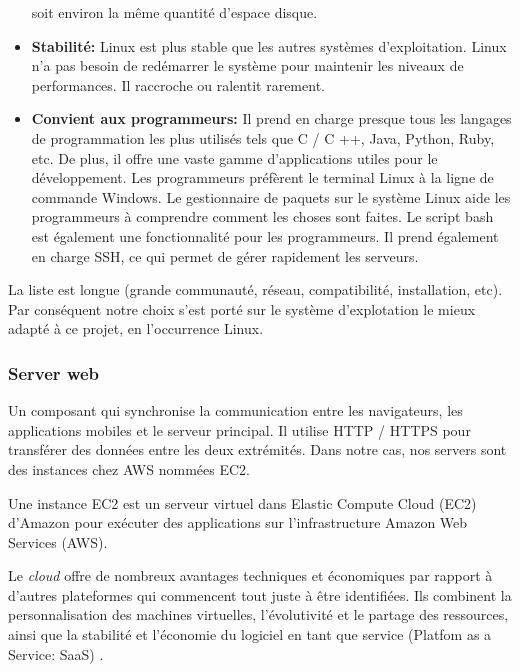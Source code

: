 \begin{itemize}
                soit environ la même quantité d'espace disque.
                \item \textbf{Stabilité: }
                Linux est plus stable que les autres systèmes d'exploitation. Linux n'a pas 
                besoin de redémarrer le système pour maintenir les niveaux de performances. 
                Il raccroche ou ralentit rarement.
                \item \textbf{Convient aux programmeurs: }
                Il prend en charge presque tous les langages de programmation les plus utilisés 
                tels que C / C ++, Java, Python, Ruby, etc. De plus, il offre une vaste gamme 
                d'applications utiles pour le développement.
                Les programmeurs préfèrent le terminal Linux à la ligne de commande Windows. 
                Le gestionnaire de paquets sur le système Linux aide les programmeurs à 
                comprendre comment les choses sont faites. Le script bash est également une 
                fonctionnalité pour les programmeurs. Il prend également en charge SSH, 
                ce qui permet de gérer rapidement les serveurs.
                
        \end{itemize}
        La liste est longue (grande communauté, réseau, compatibilité, installation, etc). Par conséquent
        notre choix s'est porté sur le système d'explotation le mieux adapté à ce projet, en l'occurrence Linux.

        \subsubsection{Server web}
        Un composant qui synchronise la communication entre les navigateurs, les applications mobiles et 
        le serveur principal. Il utilise HTTP / HTTPS pour transférer des données entre les deux extrémités.
        Dans notre cas,  nos servers sont des instances chez AWS  nommées EC2. 

        Une instance EC2 est un serveur virtuel dans Elastic Compute Cloud (EC2) d'Amazon pour exécuter 
        des applications sur l'infrastructure Amazon Web Services (AWS).
        \par 
        Le \textit{cloud} offre de nombreux avantages techniques et économiques par rapport à  
       d'autres plateformes qui commencent tout juste à être identifiées. Ils combinent la 
        personnalisation des machines virtuelles, l'évolutivité et le partage des ressources,
         ainsi que la stabilité et l'économie du logiciel en tant que service 
         (Platfom as a Service: SaaS) \cite{juve2009scientific}.

